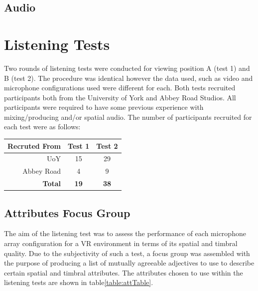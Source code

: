 \documentclass{aes2e}
\begin{document}
	\subsection{Audio}


\section{Listening Tests}

	Two rounds of listening tests were conducted for viewing position A (test 1) and B (test 2). The procedure was identical however the data used, such as video and microphone configurations used were different for each. Both tests recruited participants both from the University of York and Abbey Road Studios. All participants were required to have some previous experience with mixing/producing and/or spatial audio. The number of participants recruited for each test were as follows:

	\begin{center}
		\begin{tabular}{|r |c c|} \hline
			Recruted From & Test 1 & Test 2 \\ \hline
			UoY & 15 & 29 \\
			Abbey Road & 4 & 9 \\ 
			\textbf{Total} & \textbf{19} & \textbf{38} \\\hline
		\end{tabular}
	\end{center}

	\subsection{Attributes Focus Group}
		The aim of the listening test was to assess the performance of each microphone array configuration for a VR environment in terms of its spatial and timbral quality. Due to the subjectivity of such a test, a focus group was assembled with the purpose of producing a list of mutually agreeable adjectives to use to describe certain spatial and timbral attributes. The attributes chosen to use within the listening tests are shown in table\ref{table:attTable}. \\
\end{document}
